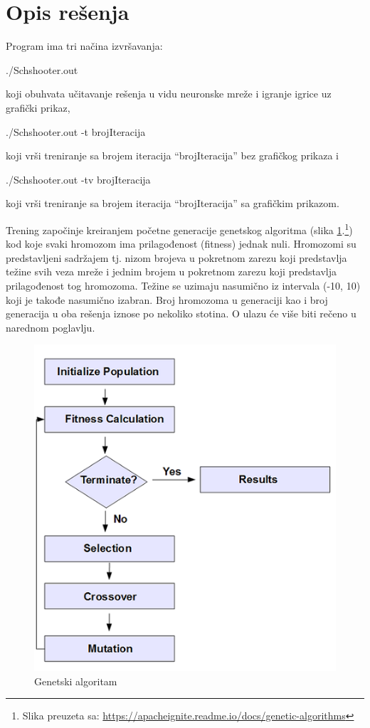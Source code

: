 \documentclass[a4paper]{article}
\begin{document}
\section{Opis rešenja}
\label{sec:opisResenja}
\par Program ima tri načina izvršavanja:
\begin{tcolorbox}
./Schshooter.out
\end{tcolorbox}
koji obuhvata učitavanje rešenja u vidu neuronske mreže i igranje igrice uz grafički prikaz,
\begin{tcolorbox}
./Schshooter.out -t brojIteracija
\end{tcolorbox}
koji vrši treniranje sa brojem iteracija “brojIteracija” bez grafičkog prikaza i
\begin{tcolorbox}
./Schshooter.out -tv brojIteracija
\end{tcolorbox}
koji vrši treniranje sa brojem iteracija “brojIteracija”  sa grafičkim prikazom.

\newpage
\par Trening započinje kreiranjem početne generacije genetskog algoritma\cite{genetic} (slika \ref{fig:genetic}.\footnote{Slika preuzeta sa: \url{https://apacheignite.readme.io/docs/genetic-algorithms}}) kod koje svaki hromozom ima prilagođenost (fitness) jednak nuli. Hromozomi su predstavljeni sadržajem tj. nizom brojeva u pokretnom zarezu koji predstavlja težine svih veza mreže i jednim brojem u pokretnom zarezu koji predstavlja prilagođenost tog hromozoma. Težine se uzimaju nasumično iz intervala (-10, 10) koji je takođe nasumično izabran. Broj hromozoma u generaciji kao i broj generacija u oba rešenja iznose po nekoliko stotina. O ulazu će više biti rečeno u narednom poglavlju.

\begin{figure}[h!]
	\begin{center}
		\includegraphics[scale=0.7]{genetic.png}
	\end{center}
	\caption{Genetski algoritam}
	\label{fig:genetic}
\end{figure}
\end{document}
